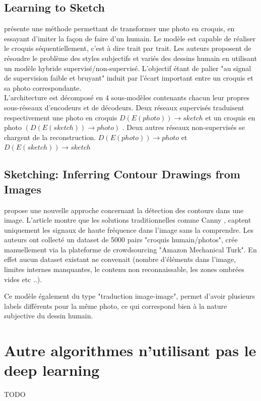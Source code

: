 \documentclass[a4paper, 12pt]{report}
\begin{document}
\subsection{Learning to Sketch} 
\cite{DBLP:journals/corr/abs-1805-00247} présente une méthode permettant de transformer une photo en croquis, en essayant d'imiter la façon de faire d'un humain. Le modèle est capable de réaliser le croquis séquentiellement, c'est à dire trait par trait. Les auteurs proposent de résoudre le problème des styles subjectifs et variés des dessins humain en utilisant un modèle hybride supervisé/non-supervisé. L'objectif étant de palier "au signal de supervision faible et bruyant" induit par l'écart important entre un croquis et sa photo correspondante. \\

L'architecture est décomposé en 4 sous-modèles contenants chacun leur propres sous-réseaux d'encodeurs et de décodeurs. Deux réseaux supervisés traduisent respectivement une photo en croquis $D(E(photo))\to sketch$ et un croquis en photo $(D(E(sketch))\to photo)$ . Deux autres réseaux non-supervisés se chargent de la reconstruction. $D(E(photo))\to photo$ et $D(E(sketch))\to sketch$  \\


\subsection{Sketching: Inferring Contour Drawings from Images}
\cite{DBLP:journals/corr/abs-1901-00542} propose une nouvelle approche concernant la détection des contours dans une image. L'article montre que les solutions traditionnelles comme Canny \cite{4767851} , captent uniquement les signaux de haute fréquence dans l’image sans la comprendre. Les auteurs ont collecté un dataset de 5000 pairs "croquis humain/photos", crée manuellement via la plateforme de crowdsourcing "Amazon Mechanical Turk". En effet aucun dataset existant ne convenait (nombre d'éléments dans l'image, limites internes manquantes, le contenu non reconnaissable, les zones ombrées vides etc ..).

Ce modèle également du type "traduction image-image", permet d'avoir plusieurs labels différents pour la même photo, ce qui correspond bien à la nature subjective du dessin humain.

\section{Autre algorithmes n'utilisant pas le deep learning}
TODO
\end{document}
